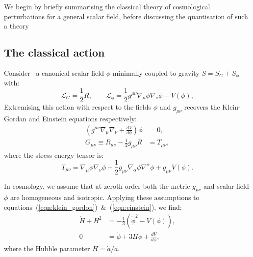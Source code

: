 We begin by briefly summarising the classical theory of cosmological perturbations for a general scalar field, before discussing the quantisation of such a theory


\subsection{The classical action}
\label{sec:inflation}
Consider~\cite{Baumann+2009} a canonical scalar field $\phi$ minimally coupled to gravity $S= S_G + S_\phi$ with:
\begin{equation}
  \mathcal{L}_G = \frac{1}{2}R, 
  \qquad
  \mathcal{L}_\phi = \frac{1}{2}g^{\mu\nu}\nabla_\mu\phi\nabla_\nu\phi - V(\phi),
  \label{eqn:action}
\end{equation}
Extremising this action with respect to the fields $\phi$ and $g_{\mu\nu}$ recovers the Klein-Gordan and Einstein equations respectively:
\begin{align}
  \left( g^{\mu\nu}\nabla_\mu\nabla_\nu + \frac{dV}{d\phi} \right) \phi &= 0,
  \label{eqn:klein_gordon}\\
  G_{\mu\nu}\equiv R_{\mu\nu}-\frac{1}{2}g_{\mu\nu}R&= T_{\mu\nu},
  \label{eqn:einstein}
\end{align}
where the stress-energy tensor is:
\begin{equation}
  T_{\mu\nu} = \nabla_\mu\phi \nabla_\nu\phi - \frac{1}{2}g_{\mu\nu} \nabla_\alpha\phi \nabla^\alpha\phi +g_{\mu\nu} V(\phi).
  \label{eqn:SET}
\end{equation}

In cosmology, we assume that at zeroth order both the metric $g_{\mu\nu}$ and scalar field $\phi$ are homogeneous and isotropic. Applying these assumptions to equations~(\ref{eqn:klein_gordon})~\&~(\ref{eqn:einstein}), we find:
\begin{align}
  \dot{H}+H^2 &= -\frac{1}{3}\left( \dot{\phi}^2 - V(\phi) \right),
  \label{eqn:Raychaudhuri}\\
  0&=\ddot{\phi} + 3H\dot{\phi} + \frac{dV}{d\phi},
\end{align}
where the Hubble parameter $H = \dot{a}/a$.
